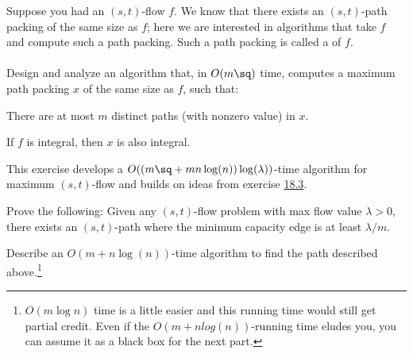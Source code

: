 \documentclass{article}
\begin{document}
\hypertarget{ex:flow-decomp}{%
 Suppose you had an \( (s, t) \)-flow \( f \). \label{ex:flow-decomp}
We know that there exists an \( (s,t) \)-path packing of the same size as \( f \); here we are interested in algorithms that take \( f \) and compute such a path packing.
Such a path packing is called a  of \( f \).\\\\
Design and analyze an algorithm that, in \( O(m\sq) \) time, computes a maximum path packing \( x \) of the same size as \( f \), such that:
}
\setcounter{section}{18}
\setcounter{exercise}{3}
\begin{subexercise}
  There are at most \( m \) distinct paths (with nonzero value) in \( x \).
\end{subexercise}

\begin{solution}

\end{solution}
\pagebreak

\begin{subexercise}
  If \( f \) is integral, then \( x \) is also integral.
\end{subexercise}

\begin{solution}

\end{solution}
\pagebreak

 This exercise develops a \( O((m\sq + mn\log(n))\log(\lambda)) \)-time algorithm for maximum \( (s,t) \)-flow and builds on ideas from exercise \hyperlink{ex:flow-decomp}{18.3}.

\begin{subexercise}
  Prove the following: Given any \( (s, t) \)-flow problem with max flow value \( \lambda > 0 \), there exists an \( (s, t) \)-path where the minimum capacity edge is at least \( \lambda/m \).
\end{subexercise}

\begin{solution}

\end{solution}
\pagebreak

\begin{subexercise}
  Describe an \( O(m+n\log(n)) \)-time algorithm to find the path described above.\footnote[4]{\( O(m\log n) \) time is a little easier and this running time would still get partial credit.
    Even if the \( O(m + n log(n)) \)-running time eludes you, you can assume it as a black box for the next part.}
\end{subexercise}
\end{document}
